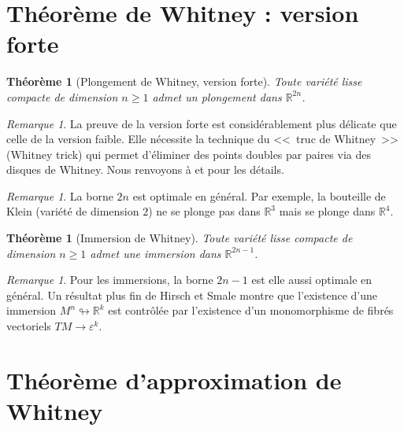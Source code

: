 \documentclass[12pt,a4paper,openany]{book}
\theoremstyle{definition}
\theoremstyle{plain}
\newtheorem{theoreme}[definition]{Théorème}
\theoremstyle{remark}
\newtheorem{remarque}[definition]{Remarque}
\newcommand{\R}{\mathbb{R}}
\begin{document}
\section{Théorème de Whitney : version forte}\label{sec:whitney-fort}

\begin{theoreme}[Plongement de Whitney, version forte]\label{thm:whitney-fort}
Toute variété lisse compacte de dimension $n \geqslant 1$ admet un plongement
dans $\R^{2n}$.
\end{theoreme}

\begin{remarque}
La preuve de la version forte est considérablement plus délicate que celle de la
version faible. Elle nécessite la technique du <<~truc de Whitney~>>
 (Whitney trick) qui permet d'éliminer des points doubles
par paires via des disques de Whitney. Nous renvoyons à \cite{Whitney1944} et
\cite{AdachiBook} pour les détails.
\end{remarque}

\begin{remarque}
La borne $2n$ est optimale en général. Par exemple, la bouteille de
Klein (variété de dimension $2$) ne se plonge pas dans
$\R^3$ mais se plonge dans $\R^4$.
\end{remarque}

\begin{theoreme}[Immersion de Whitney]\label{thm:whitney-immersion}
Toute variété lisse compacte de dimension $n \geqslant 1$ admet une immersion
dans $\R^{2n-1}$.
\end{theoreme}

\begin{remarque}
Pour les immersions, la borne $2n - 1$ est elle aussi optimale en général. Un
résultat plus fin de Hirsch et Smale montre que l'existence d'une immersion
$M^n \looparrowright \R^k$ est contrôlée par l'existence d'un monomorphisme de
fibrés vectoriels $TM \to \varepsilon^k$.
\end{remarque}

\section{Théorème d'approximation de Whitney}\label{sec:whitney-approx}
\end{document}
